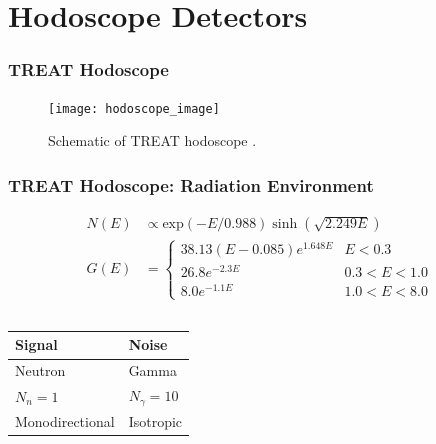 \documentclass[fleqn]{beamer}
\begin{document}
   \section{Hodoscope Detectors}
   \begin{frame}
    \frametitle{TREAT Hodoscope}
    \begin{figure}
        \texttt{[image: hodoscope\_image]}
        \caption{Schematic of TREAT hodoscope \cite{treat_hodoscope_image}.}
       \end{figure}
   \end{frame}

    \begin{frame}
     \frametitle{TREAT Hodoscope: Radiation Environment}
      \begin{equation*}
      \begin{split}
 N(E) &\propto \mbox{exp}(-E / 0.988) \sinh(\sqrt{2.249 E})\\
 G(E) &= \left\{ \begin{array}{ll}
                 38.13 (E - 0.085) e^{1.648E} & E < 0.3\\
                 26.8 e^{-2.3E} & 0.3 < E < 1.0\\
                 8.0e^{-1.1E} & 1.0 < E < 8.0
                \end{array} \right.
      \end{split}
      \end{equation*}
      
     \begin{columns}[c]
      \begin{column}{.5\textwidth}
       \begin{tabular}{ll}
      \toprule
      Signal & Noise\\
      \midrule
       Neutron & Gamma\\
       $N_n = 1$ & $N_\gamma = 10$ \cite{de1975fast}\\
       Monodirectional & Isotropic\\
       \bottomrule
      \end{tabular}
      \end{column}


\end{columns}
\end{frame}
\end{document}
